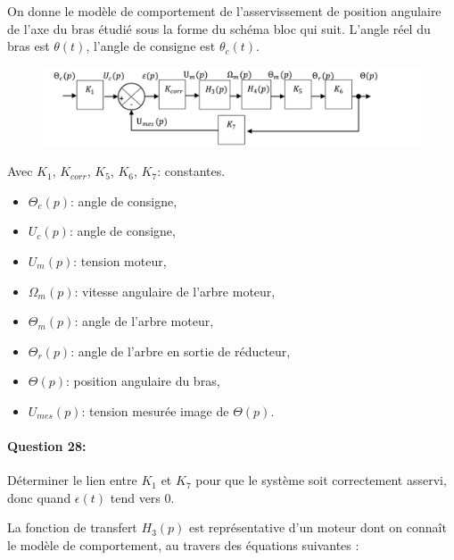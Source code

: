 On donne le modèle de comportement de l'asservissement de position angulaire de l'axe du bras étudié sous la forme du schéma bloc qui suit. L'angle réel du bras est $\theta(t)$, l'angle de consigne est $\theta_c(t)$.

\begin{figure}[!h]
  \centering
  \includegraphics[width=0.6\linewidth]{img/robot3}
  \label{robot3}
\end{figure}

\begin{minipage}{0.45\linewidth}
Avec $K_1$, $K_{corr}$, $K_5$, $K_6$, $K_7$: constantes.
\begin{itemize}
 \item $\Theta_c(p)$: angle de consigne,
 \item $U_c(p)$: angle de consigne,
 \item $U_m(p)$: tension moteur,
 \item $\Omega_m(p)$: vitesse angulaire de l'arbre moteur,
\end{itemize} 
\end{minipage}\hfill
\begin{minipage}{0.45\linewidth}
\begin{itemize}
 \item $\Theta_m(p)$: angle de l'arbre moteur,
 \item $\Theta_r(p)$: angle de l'arbre en sortie de réducteur,
 \item $\Theta(p)$: position angulaire du bras,
 \item $U_{mes}(p)$: tension mesurée image de $\Theta(p)$.
\end{itemize}
\end{minipage}

\paragraph{Question 28:} Déterminer le lien entre $K_1$ et $K_7$ pour que le système soit correctement asservi, donc quand $\epsilon(t)$ tend vers 0.

La fonction de transfert $H_3(p)$ est représentative d'un moteur dont on connaît le modèle de comportement, au travers des équations suivantes :

~\


